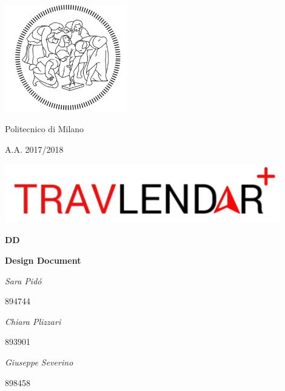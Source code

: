 \documentclass[12pt,titlepage]{article}
\begin{document}
\begin{titlepage}
\centering
\includegraphics[width=0.4\textwidth]{Logos/LogoPolimi}\par
	{{Politecnico di Milano} \par}
	{{A.A. 2017/2018} \par}
	\vspace{1.5cm}
	\includegraphics[width=0.9\textwidth]{Logos/LogoTravlendar}\par
	\vspace{1.5cm}
	{\Huge \textbf {DD}\par}
	{ \textbf{Design Document} \par}
	\vspace{1.5cm}
	{\Large\itshape Sara Pid\'o  }{\Large   {  894744}\par}
	{\Large\itshape Chiara Plizzari }{\Large   {  893901}\par}
	{\Large\itshape Giuseppe Severino }{\Large   {  898458}\par}
	\vspace{2cm}
	\vfill
\end{titlepage}

\newpage\null\thispagestyle{empty}\newpage



\end{document}

